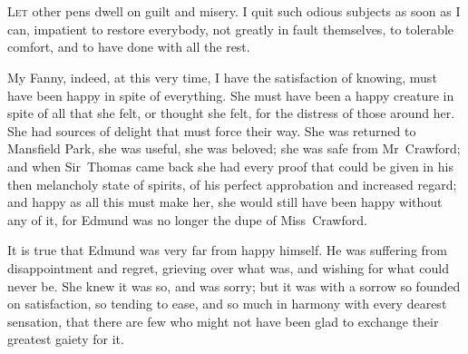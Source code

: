 \chapter[Chapter \thechapter]{} 

 \lettrine[lraise=0.3]{L}{et} other pens dwell on guilt and misery. I quit such odious subjects as soon as I can, impatient to restore everybody, not greatly in fault themselves, to tolerable comfort, and to have done with all the rest.

My Fanny, indeed, at this very time, I have the satisfaction of knowing, must have been happy in spite of everything. She must have been a happy creature in spite of all that she felt, or thought she felt, for the distress of those around her. She had sources of delight that must force their way. She was returned to Mansfield Park, she was useful, she was beloved; she was safe from Mr~Crawford; and when Sir~Thomas came back she had every proof that could be given in his then melancholy state of spirits, of his perfect approbation and increased regard; and happy as all this must make her, she would still have been happy without any of it, for Edmund was no longer the dupe of Miss~Crawford.

It is true that Edmund was very far from happy himself. He was suffering from disappointment and regret, grieving over what was, and wishing for what could never be. She knew it was so, and was sorry; but it was with a sorrow so founded on satisfaction, so tending to ease, and so much in harmony with every dearest sensation, that there are few who might not have been glad to exchange their greatest gaiety for it.

